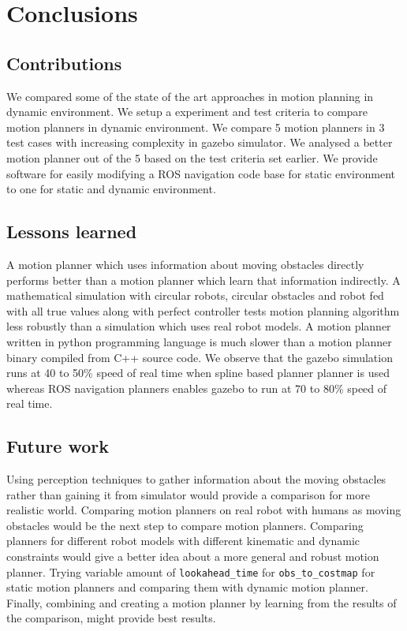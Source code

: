 
\chapter{Conclusions}

\section{Contributions}
\label{sec:contributions}
We compared some of the state of the art approaches in motion planning in dynamic environment.
We setup a experiment and test criteria to compare motion planners in dynamic environment.
We compare 5 motion planners in 3 test cases with increasing complexity in gazebo simulator.
We analysed a better motion planner out of the 5 based on the test criteria set earlier.
We provide software for easily modifying a ROS navigation code base for static environment to
one for static and dynamic environment.

\section{Lessons learned}
\label{sec:lessons_learned}
A motion planner which uses information about moving obstacles directly performs better
than a motion planner which learn that information indirectly. 
A mathematical simulation with circular robots, circular obstacles and robot fed with
all true values along with perfect controller tests motion planning
algorithm less robustly than a simulation which uses real robot models. 
A motion planner written in python programming language is much slower than a motion planner
binary compiled from C++ source code. We observe that the gazebo simulation runs at 40 to 50\% speed of real time
when spline based planner\cite{omgtools} planner is used whereas ROS navigation
planners\cite{dwa, tebLocalPlanner, eband}  enables gazebo
to run at 70 to 80\% speed of real time.

\section{Future work}
\label{sec:future_work}
Using perception techniques to gather information about the moving obstacles rather than
gaining it from simulator would provide a comparison for more realistic world.
Comparing motion planners on real robot with humans as moving obstacles would be the next step to 
compare motion planners.
Comparing planners for different robot models with different kinematic and dynamic constraints would
give a better idea about a more general and robust motion planner.
Trying variable amount of \texttt{lookahead\_time} for \texttt{obs\_to\_costmap} for static motion planners
and comparing them with dynamic motion planner.
Finally, combining and creating a motion planner by learning from the results of the comparison, might
provide best results.
